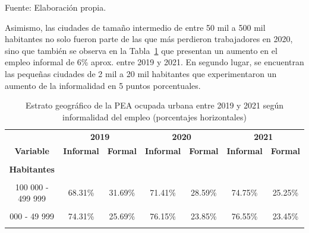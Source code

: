 \documentclass[
  letterpaper,
  12pt,
  oneside,
  spanish,
  doublespacing,
  headsepline,
  parskip]{MastersDoctoralThesis}
\begin{document}
\noindent \small Fuente: Elaboración propia. \normalsize

Asimismo, las ciudades de tamaño intermedio de entre 50 mil a 500 mil
habitantes no solo fueron parte de las que más perdieron trabajadores en
2020, sino que también se observa en la Tabla~\ref{tbl-estr} que
presentan un aumento en el empleo informal de 6\% aprox. entre 2019 y
2021. En segundo lugar, se encuentran las pequeñas ciudades de 2 mil a
20 mil habitantes que experimentaron un aumento de la informalidad en 5
puntos porcentuales.

\hypertarget{tbl-estr}{}
\begin{table}[H]
\caption{\label{tbl-estr}Estrato geográfico de la PEA ocupada urbana entre 2019 y 2021 según
informalidad del empleo (porcentajes horizontales) }\tabularnewline

\centering\begingroup\fontsize{10}{12}\selectfont

\begin{tabular}{ccccccc}
\toprule
\multicolumn{1}{c}{ } & \multicolumn{2}{c}{\textbf{2019}} & \multicolumn{2}{c}{\textbf{2020}} & \multicolumn{2}{c}{\textbf{2021}} \\
\cmidrule(l{3pt}r{3pt}){2-3} \cmidrule(l{3pt}r{3pt}){4-5} \cmidrule(l{3pt}r{3pt}){6-7}
\textbf{Variable} & \textbf{Informal} & \textbf{Formal} & \textbf{Informal} & \textbf{Formal} & \textbf{Informal} & \textbf{Formal}\\
\midrule
\cellcolor{gray!6}{\textbf{Nacional}} & \cellcolor{gray!6}{66.40\%} & \cellcolor{gray!6}{33.60\%} & \cellcolor{gray!6}{68.42\%} & \cellcolor{gray!6}{31.58\%} & \cellcolor{gray!6}{71.41\%} & \cellcolor{gray!6}{28.59\%}\\
\textbf{Habitantes} &  &  &  &  &  & \\
\cellcolor{gray!6}{500 000 a más} & \cellcolor{gray!6}{59.33\%} & \cellcolor{gray!6}{40.67\%} & \cellcolor{gray!6}{58.66\%} & \cellcolor{gray!6}{41.34\%} & \cellcolor{gray!6}{62.96\%} & \cellcolor{gray!6}{37.04\%}\\
100 000 - 499 999 & 68.31\% & 31.69\% & 71.41\% & 28.59\% & 74.75\% & 25.25\%\\
\cellcolor{gray!6}{50 000 - 99 999} & \cellcolor{gray!6}{69.71\%} & \cellcolor{gray!6}{30.29\%} & \cellcolor{gray!6}{73.73\%} & \cellcolor{gray!6}{26.27\%} & \cellcolor{gray!6}{75.64\%} & \cellcolor{gray!6}{24.36\%}\\
\addlinespace
20 000 - 49 999 & 74.31\% & 25.69\% & 76.15\% & 23.85\% & 76.55\% & 23.45\%\\
\cellcolor{gray!6}{2 000 - 19 999} & \cellcolor{gray!6}{78.12\%} & \cellcolor{gray!6}{21.88\%} & \cellcolor{gray!6}{81.60\%} & \cellcolor{gray!6}{18.40\%} & \cellcolor{gray!6}{83.40\%} & \cellcolor{gray!6}{16.60\%}\\
\bottomrule
\end{tabular}
\endgroup{}
\end{table}
\end{document}
